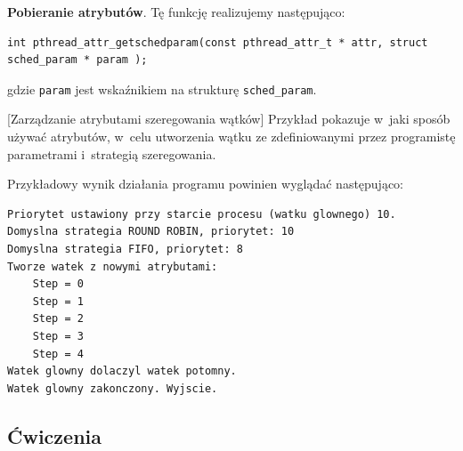 \noindent\textbf{Pobieranie atrybutów}. Tę funkcję realizujemy następująco:

\begin{lstlisting}[style=MyCStyle]
int pthread_attr_getschedparam(const pthread_attr_t * attr, struct sched_param * param );
\end{lstlisting}

gdzie \lstinline[style=MyCStyle]{param} jest wskaźnikiem na strukturę \lstinline[style=MyCStyle]{sched_param}.

\begin{example}{[Zarządzanie atrybutami szeregowania wątków]}
Przykład pokazuje w~jaki sposób używać atrybutów, w~celu utworzenia wątku ze zdefiniowanymi przez programistę parametrami i~strategią szeregowania.



Przykładowy wynik działania programu powinien wyglądać następująco:

\begin{lstlisting}[style=MyCStyle]
Priorytet ustawiony przy starcie procesu (watku glownego) 10.
Domyslna strategia ROUND ROBIN, priorytet: 10
Domyslna strategia FIFO, priorytet: 8
Tworze watek z nowymi atrybutami:
	Step = 0
	Step = 1
	Step = 2
	Step = 3
	Step = 4
Watek glowny dolaczyl watek potomny.
Watek glowny zakonczony. Wyjscie.
\end{lstlisting}

\end{example}


\subsection{Ćwiczenia}

